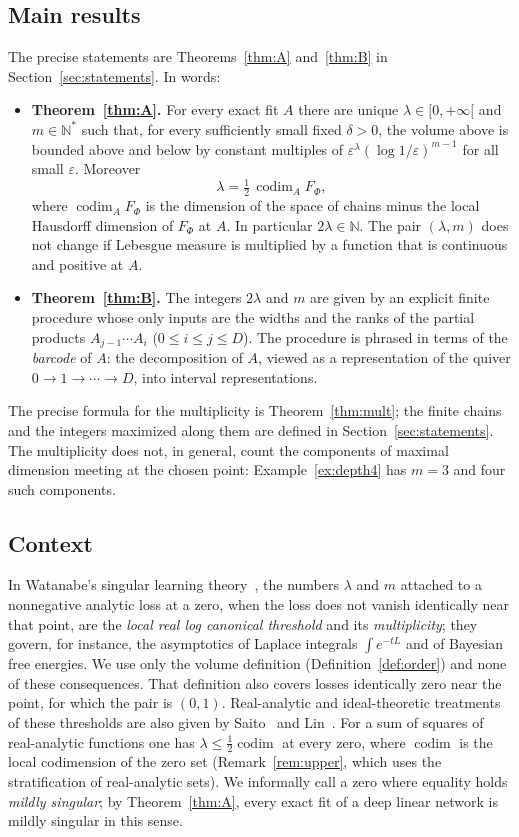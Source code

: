 \documentclass[11pt,a4paper]{article}
\theoremstyle{definition}
\theoremstyle{remark}
\numberwithin{equation}{section}
\newcommand{\N}{\mathbb{N}}
\newcommand{\codim}{\operatorname{codim}}
\newcommand{\eps}{\varepsilon}
\begin{document}
\subsection{Main results}
The precise statements are Theorems~\ref{thm:A} and~\ref{thm:B} in Section~\ref{sec:statements}. In words:

\begin{itemize}
\item \textbf{Theorem~\ref{thm:A}.} For every exact fit $A$ there are unique $\lambda\in[0,+\infty[$ and $m\in\N^*$ such that, for every sufficiently small fixed $\delta>0$, the volume above is bounded above and below by constant multiples of $\eps^{\lambda}(\log1/\eps)^{m-1}$ for all small $\eps$. Moreover
\[
\lambda=\tfrac12\,\codim_AF_\Phi,
\]
where $\codim_AF_\Phi$ is the dimension of the space of chains minus the local Hausdorff dimension of $F_\Phi$ at $A$. In particular $2\lambda\in\N$. The pair $(\lambda,m)$ does not change if Lebesgue measure is multiplied by a function that is continuous and positive at $A$.
\item \textbf{Theorem~\ref{thm:B}.} The integers $2\lambda$ and $m$ are given by an explicit finite procedure whose only inputs are the widths and the ranks of the partial products $A_{j-1}\cdots A_i$ ($0\le i\le j\le D$). The procedure is phrased in terms of the \emph{barcode} of $A$: the decomposition of $A$, viewed as a representation of the quiver $0\to1\to\cdots\to D$, into interval representations.
\end{itemize}

The precise formula for the multiplicity is Theorem~\ref{thm:mult}; the finite chains and the integers maximized along them are defined in Section~\ref{sec:statements}. The multiplicity does not, in general, count the components of maximal dimension meeting at the chosen point: Example~\ref{ex:depth4} has $m=3$ and four such components.

\subsection{Context}
In Watanabe's singular learning theory~\cite{watanabe-book,watanabe-2018}, the numbers $\lambda$ and $m$ attached to a nonnegative analytic loss at a zero, when the loss does not vanish identically near that point, are the \emph{local real log canonical threshold} and its \emph{multiplicity}; they govern, for instance, the asymptotics of Laplace integrals $\int e^{-tL}$ and of Bayesian free energies. We use only the volume definition (Definition~\ref{def:order}) and none of these consequences. That definition also covers losses identically zero near the point, for which the pair is $(0,1)$. Real-analytic and ideal-theoretic treatments of these thresholds are also given by Saito~\cite{saito} and Lin~\cite{lin}. For a sum of squares of real-analytic functions one has $\lambda\le\frac12\codim$ at every zero, where $\codim$ is the local codimension of the zero set (Remark~\ref{rem:upper}, which uses the stratification of real-analytic sets). We informally call a zero where equality holds \emph{mildly singular}; by Theorem~\ref{thm:A}, every exact fit of a deep linear network is mildly singular in this sense.
\end{document}
